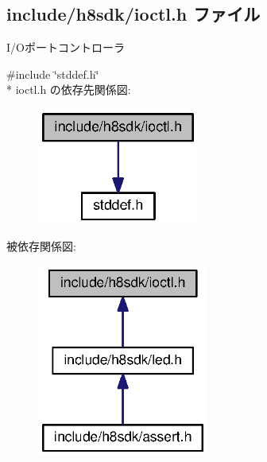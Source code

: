 \subsection{include/h8sdk/ioctl.h ファイル}
\label{ioctl_8h}


I/\+Oポートコントローラ  


{\ttfamily \#include \char`\"{}stddef.\+h\char`\"{}}\\*
ioctl.\+h の依存先関係図\+:
\nopagebreak
\begin{figure}[H]
\begin{center}
\leavevmode
\includegraphics[width=151pt]{db/d0c/ioctl_8h__incl}
\end{center}
\end{figure}
被依存関係図\+:
\nopagebreak
\begin{figure}[H]
\begin{center}
\leavevmode
\includegraphics[width=160pt]{d6/da7/ioctl_8h__dep__incl}
\end{center}
\end{figure}
